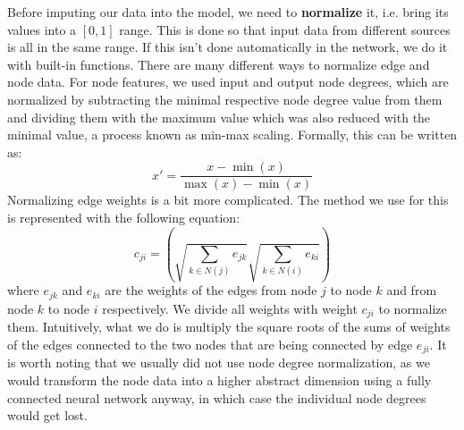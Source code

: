 \documentclass[times, utf8, diplomski, english]{fer_eng}
\begin{document}
Before imputing our data into the model, we need to \textbf{normalize} it, i.e. bring its values into a $[0,1]$ range. This is done so that input data from different sources is all in the same range. If this isn't done automatically in the network, we do it with built-in functions. There are many different ways to normalize edge and node data. For node features, we used input and output node degrees, which are normalized by subtracting the minimal respective node degree value from them and dividing them with the maximum value which was also reduced with the minimal value, a process known as min-max scaling. Formally, this can be written as:
\[ x' = \frac{x - \min(x)}{\max(x) - \min(x)} \]
Normalizing edge weights is a bit more complicated. The method we use for this is represented with the following equation:
\[ c_{ji} = \left( \sqrt{\sum_{k \in N(j)} e_{jk} } \sqrt{\sum_{k \in N(i)} e_{ki} } \right) \]
where $e_{jk}$ and $e_{ki}$ are the weights of the edges from node $j$ to node $k$ and from node $k$ to node $i$ respectively. We divide all weights with weight $c_{ji}$ to normalize them. Intuitively, what we do is multiply the square roots of the sums of weights of the edges connected to the two nodes that are being connected by edge $e_{ji}$. It is worth noting that we usually did not use node degree normalization, as we would transform the node data into a higher abstract dimension using a fully connected neural network anyway, in which case the individual node degrees would get lost.
\end{document}

